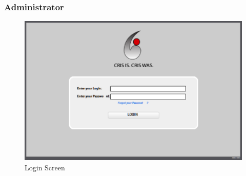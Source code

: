 \subsubsection{Administrator}
\begin{figure}[htbp]
\begin{center}
 \caption{\label{fig:W0} Login Screen}
   \includegraphics[width=150mm]{./images/Web/login.eps}
\end{center}
\end{figure}

